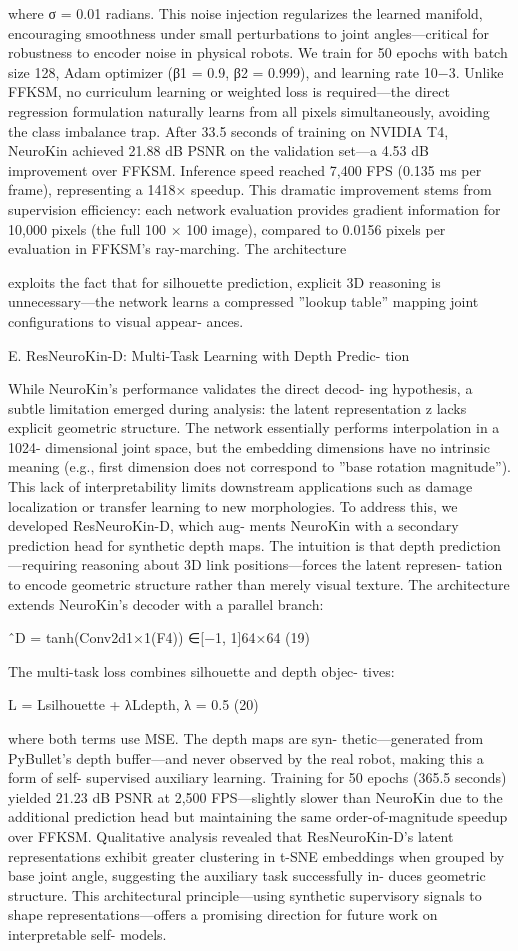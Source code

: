 \documentclass[10pt,twocolumn,letterpaper]{article}
\begin{document}
where σ = 0.01 radians. This noise injection regularizes the learned manifold, encouraging smoothness under small perturbations to joint angles—critical for robustness to encoder noise in physical robots. We train for 50 epochs with batch size 128, Adam optimizer (β1 = 0.9, β2 = 0.999), and learning rate 10−3. Unlike FFKSM, no curriculum learning or weighted loss is required—the direct regression formulation naturally learns from all pixels simultaneously, avoiding the class imbalance trap. After 33.5 seconds of training on NVIDIA T4, NeuroKin achieved 21.88 dB PSNR on the validation set—a 4.53 dB improvement over FFKSM. Inference speed reached 7,400 FPS (0.135 ms per frame), representing a 1418× speedup. This dramatic improvement stems from supervision efficiency: each network evaluation provides gradient information for 10,000 pixels (the full 100 × 100 image), compared to 0.0156 pixels per evaluation in FFKSM’s ray-marching. The architecture

exploits the fact that for silhouette prediction, explicit 3D reasoning is unnecessary—the network learns a compressed ”lookup table” mapping joint configurations to visual appear- ances.

E. ResNeuroKin-D: Multi-Task Learning with Depth Predic- tion

While NeuroKin’s performance validates the direct decod- ing hypothesis, a subtle limitation emerged during analysis: the latent representation z lacks explicit geometric structure. The network essentially performs interpolation in a 1024- dimensional joint space, but the embedding dimensions have no intrinsic meaning (e.g., first dimension does not correspond to ”base rotation magnitude”). This lack of interpretability limits downstream applications such as damage localization or transfer learning to new morphologies. To address this, we developed ResNeuroKin-D, which aug- ments NeuroKin with a secondary prediction head for synthetic depth maps. The intuition is that depth prediction—requiring reasoning about 3D link positions—forces the latent represen- tation to encode geometric structure rather than merely visual texture. The architecture extends NeuroKin’s decoder with a parallel branch:

ˆD = tanh(Conv2d1×1(F4)) ∈[−1, 1]64×64 (19)

The multi-task loss combines silhouette and depth objec- tives:

L = Lsilhouette + λLdepth, λ = 0.5 (20)

where both terms use MSE. The depth maps are syn- thetic—generated from PyBullet’s depth buffer—and never observed by the real robot, making this a form of self- supervised auxiliary learning. Training for 50 epochs (365.5 seconds) yielded 21.23 dB PSNR at 2,500 FPS—slightly slower than NeuroKin due to the additional prediction head but maintaining the same order-of-magnitude speedup over FFKSM. Qualitative analysis revealed that ResNeuroKin-D’s latent representations exhibit greater clustering in t-SNE embeddings when grouped by base joint angle, suggesting the auxiliary task successfully in- duces geometric structure. This architectural principle—using synthetic supervisory signals to shape representations—offers a promising direction for future work on interpretable self- models.
\end{document}
